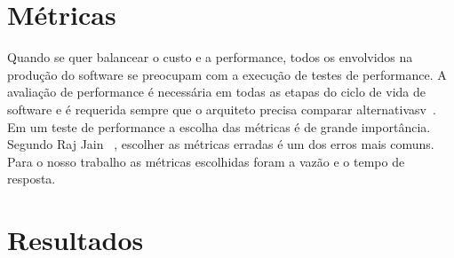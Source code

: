 \section{Métricas}

Quando se quer balancear o custo e a performance, todos os envolvidos na produção do software se preocupam com a execução de testes de performance. A avaliação de performance é necessária em todas as etapas do ciclo de vida de software e é requerida sempre que o arquiteto precisa comparar alternativasv~\cite{rajjain}. Em um teste de performance a escolha das métricas é de grande importância. Segundo Raj Jain ~\cite{rajjain}, escolher as métricas erradas é um dos erros mais comuns. Para o nosso trabalho as métricas escolhidas foram a vazão e o tempo de resposta.

\section{Resultados}



